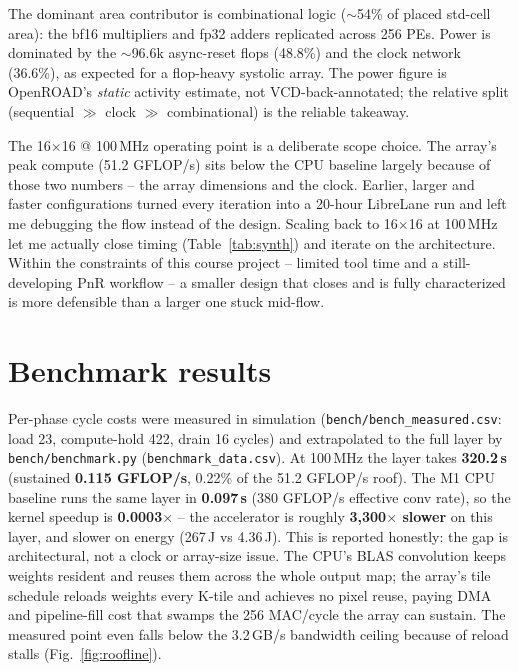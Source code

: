 \documentclass[11pt]{article}
\begin{document}
The dominant area contributor is combinational logic ($\sim$54\% of placed
std-cell area): the bf16 multipliers and fp32 adders replicated across 256 PEs.
Power is dominated by the $\sim$96.6k async-reset flops (48.8\%) and the clock
network (36.6\%), as expected for a flop-heavy systolic array. The power figure
is OpenROAD's \emph{static} activity estimate, not VCD-back-annotated; the
relative split (sequential $\gg$ clock $\gg$ combinational) is the reliable
takeaway.

The 16$\times$16 @ 100\,MHz operating point is a deliberate scope choice. The
array's peak compute (51.2 GFLOP/s) sits below the CPU baseline largely because
of those two numbers -- the array dimensions and the clock. Earlier, larger and
faster configurations turned every iteration into a 20-hour LibreLane run and
left me debugging the flow instead of the design. Scaling back to 16$\times$16
at 100\,MHz let me actually close timing (Table~\ref{tab:synth}) and iterate on
the architecture. Within the constraints of this course project -- limited tool
time and a still-developing PnR workflow --  a smaller
design that closes and is fully characterized is more defensible than a larger
one stuck mid-flow.

\section{Benchmark results}
Per-phase cycle costs were measured in simulation
(\texttt{bench/bench\_measured.csv}: load 23, compute-hold 422, drain 16
cycles) and extrapolated to the full layer by \texttt{bench/benchmark.py}
(\texttt{benchmark\_data.csv}). At 100\,MHz the layer takes
\textbf{320.2\,s} (sustained \textbf{0.115 GFLOP/s}, 0.22\% of the 51.2
GFLOP/s roof). The M1 CPU baseline runs the same layer in \textbf{0.097\,s}
(380 GFLOP/s effective conv rate), so the kernel speedup is
\textbf{0.0003$\times$} -- the accelerator is roughly \textbf{3{,}300$\times$
slower} on this layer, and slower on energy (267\,J vs 4.36\,J). This is
reported honestly: the gap is architectural, not a clock or array-size issue.
The CPU's BLAS convolution keeps weights resident and reuses them across the
whole output map; the array's tile schedule reloads weights every K-tile and
achieves no pixel reuse, paying DMA and pipeline-fill cost that swamps the 256
MAC/cycle the array can sustain. The measured point even falls below the
3.2\,GB/s bandwidth ceiling because of reload stalls (Fig.~\ref{fig:roofline}).
\end{document}
